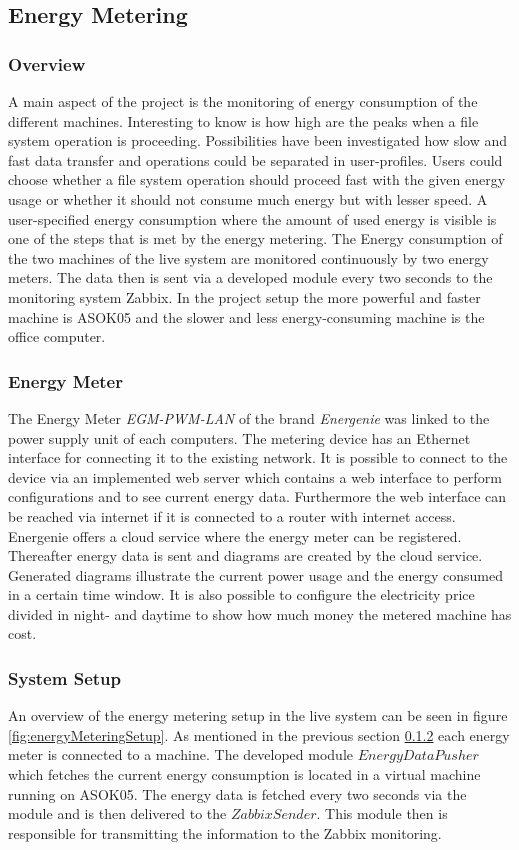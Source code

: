\subsection{Energy Metering}

\subsubsection{Overview}
A main aspect of the project is the monitoring of energy consumption of the different machines. Interesting to know is how high are the peaks when a file system operation is proceeding. Possibilities have been investigated how slow and fast data transfer and operations could be separated in user-profiles. Users could choose whether a file system operation should proceed fast with the given energy usage or whether it should not consume much energy but with lesser speed. A user-specified energy consumption where the amount of used energy is visible is one of the steps that is met by the energy metering. The Energy consumption of the two machines of the live system are monitored continuously by two energy meters. The data then is sent via a developed module every two seconds to the monitoring system Zabbix. In the project setup the more powerful and faster machine is ASOK05 and the slower and less energy-consuming machine is the office computer.

\subsubsection{Energy Meter}
\label{sec:EnergyMeter}
The Energy Meter \textit{EGM-PWM-LAN} of the brand \textit{Energenie} was linked to the power supply unit of each computers. The metering device has an Ethernet interface for connecting it to the existing network. It is possible to connect to the device via an implemented web server which contains a web interface to perform configurations and to see current energy data. Furthermore the web interface can be reached via internet if it is connected to a router with internet access. Energenie offers a cloud service \cite{Energenie.2014} where the energy meter can be registered. Thereafter energy data is sent and diagrams are created by the cloud service. Generated diagrams illustrate the current power usage and the energy consumed in a certain time window. It is also possible to configure the electricity price divided in night- and daytime to show how much money the metered machine has cost.

\subsubsection{System Setup}
An overview of the energy metering setup in the live system can be seen in figure \ref{fig:energyMeteringSetup}. As mentioned in the previous section \ref{sec:EnergyMeter} each energy meter is connected to a machine. The developed module $ EnergyDataPusher $ which fetches the current energy consumption is located in a virtual machine running on ASOK05. The energy data is fetched every two seconds via the module and is then delivered to the $ ZabbixSender $. This module then is responsible for transmitting the information to the Zabbix monitoring.

